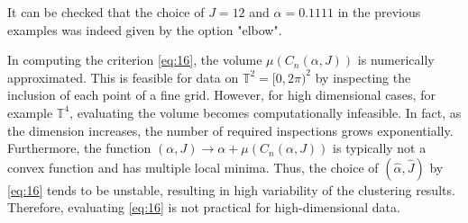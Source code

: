 It can be checked that 
 the choice of $J=12$ and $\alpha = 0.1111$ in the previous examples was indeed given by the option "elbow".
 
 

 
 
In computing the criterion \eqref{eq:16}, the volume $\mu\left(C_n\left(\alpha, J\right)\right)$ is numerically approximated. This is feasible for data on $\mathbb{T}^2=[0,2\pi)^2$ by inspecting the inclusion of each point of a fine grid.
%
%
%
However, for high dimensional cases, for example $\mathbb{T}^4$, evaluating the volume %
becomes computationally infeasible. In fact, as the dimension increases, the number of required inspections grows exponentially. Furthermore, the function {$(\alpha,J)\rightarrow \alpha + \mu\left(C_n(\alpha,J)\right)$} is typically not a convex function and has multiple local minima. Thus, the choice of $\left(\hat{\alpha},\hat{J}\right)$ by \eqref{eq:16} tends to be unstable, resulting in high variability of the clustering results. Therefore, evaluating \eqref{eq:16} is not practical for high-dimensional data.

